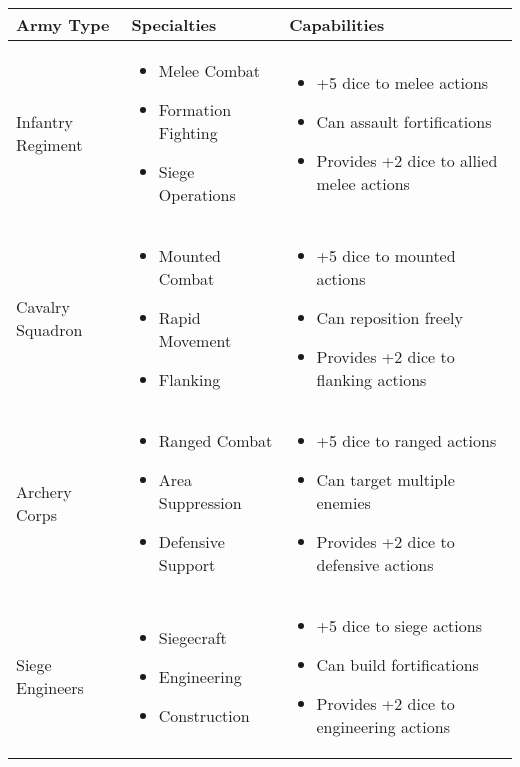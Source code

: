 \begin{longtable}{|>{\raggedright\arraybackslash}p{3cm}|>{\raggedright\arraybackslash}p{4cm}|>{\raggedright\arraybackslash}p{5cm}|}
\hline
\textbf{Army Type} & \textbf{Specialties} & \textbf{Capabilities} \\
\hline
Infantry Regiment & 
\begin{itemize}
    \item Melee Combat
    \item Formation Fighting
    \item Siege Operations
\end{itemize} & 
\begin{itemize}
    \item +5 dice to melee actions
    \item Can assault fortifications
    \item Provides +2 dice to allied melee actions
\end{itemize} \\
\hline
Cavalry Squadron & 
\begin{itemize}
    \item Mounted Combat
    \item Rapid Movement
    \item Flanking
\end{itemize} & 
\begin{itemize}
    \item +5 dice to mounted actions
    \item Can reposition freely
    \item Provides +2 dice to flanking actions
\end{itemize} \\
\hline
Archery Corps & 
\begin{itemize}
    \item Ranged Combat
    \item Area Suppression
    \item Defensive Support
\end{itemize} & 
\begin{itemize}
    \item +5 dice to ranged actions
    \item Can target multiple enemies
    \item Provides +2 dice to defensive actions
\end{itemize} \\
\hline
Siege Engineers & 
\begin{itemize}
    \item Siegecraft
    \item Engineering
    \item Construction
\end{itemize} & 
\begin{itemize}
    \item +5 dice to siege actions
    \item Can build fortifications
    \item Provides +2 dice to engineering actions
\end{itemize} \\
\hline
\end{longtable}

